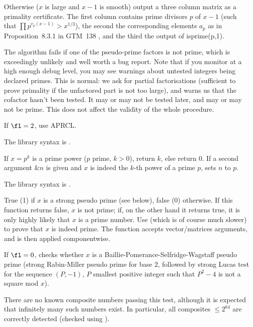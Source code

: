 \item Otherwise ($x$ is large and $x-1$ is smooth) output a three column
matrix as a primality certificate. The first column contains prime
divisors $p$ of $x-1$ (such that $\prod p^{v_p(x-1)} > x^{1/3}$), the second
the corresponding elements $a_p$ as in Proposition~8.3.1 in GTM~138 , and the
third the output of isprime(p,1).

The algorithm fails if one of the pseudo-prime factors is not prime, which is
exceedingly unlikely and well worth a bug report. Note that if you monitor
 at a high enough debug level, you may see warnings about
untested integers being declared primes. This is normal: we ask for partial
factorisations (sufficient to prove primality if the unfactored part is not
too large), and  warns us that the cofactor hasn't been tested.
It may or may not be tested later, and may or may not be prime. This does
not affect the validity of the whole  procedure.

If $\fl=2$, use APRCL.

The library syntax is .

\label{se:isprimepower}
If $x = p^k$ is a prime power ($p$ prime, $k > 0$), return $k$, else
return 0. If a second argument $\&n$ is given and $x$ is indeed
the $k$-th power of a prime $p$, sets $n$ to $p$.

The library syntax is .

\label{se:ispseudoprime}
True (1) if $x$ is a strong pseudo
prime (see below), false (0) otherwise. If this function returns false, $x$
is not prime; if, on the other hand it returns true, it is only highly likely
that $x$ is a prime number. Use  (which is of course much
slower) to prove that $x$ is indeed prime.
The function accepts vector/matrices arguments, and is then applied
componentwise.

If $\fl = 0$, checks whether $x$ is a Baillie-Pomerance-Selfridge-Wagstaff
pseudo prime (strong Rabin-Miller pseudo prime for base $2$, followed by
strong Lucas test for the sequence $(P,-1)$, $P$ smallest positive integer
such that $P^2 - 4$ is not a square mod $x$).

There are no known composite numbers passing this test, although it is
expected that infinitely many such numbers exist. In particular, all
composites $\leq 2^{64}$ are correctly detected (checked using
).

